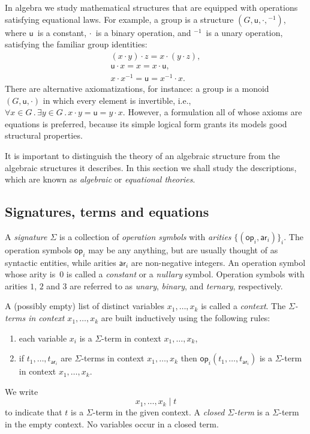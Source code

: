 \documentclass{amsart}
\newcommand{\all}[1]{\forall #1 \,.\,} %
\newcommand{\some}[1]{\exists #1 \,.\,} %
\newcommand{\family}[2]{\{#1\}_{#2}} %
\newcommand{\op}[1]{\mathsf{op}_{#1}} %
\newcommand{\arity}[1]{\mathsf{ar}_{#1}} %
\begin{document}
In algebra we study mathematical structures that are equipped with operations satisfying
equational laws. For example, a group is a structure $(G, \mathsf{u}, {\cdot}, {}^{-1})$,
where $\mathsf{u}$~is a constant, $\cdot$~is a binary operation, and ${}^{-1}$~is a unary
operation, satisfying the familiar group identities:
%
\begin{gather*}
  (x \cdot y) \cdot z = x \cdot (y \cdot z),\\
  \mathsf{u} \cdot x = x = x \cdot \mathsf{u},\\
  x \cdot x^{-1} = \mathsf{u} = x^{-1} \cdot x.
\end{gather*}
%
There are alternative axiomatizations, for instance: a group is a monoid
$(G, \mathsf{u}, {\cdot})$ in which every element is invertible, i.e.,
$\all{x \in G} \some{y \in G} x \cdot y = \mathsf{u} = y \cdot x$. However, a
formulation all of whose axioms are equations is preferred, because its simple
logical form grants its models good structural properties.

It is important to distinguish the theory of an algebraic structure from the
algebraic structures it describes. In this section we shall study the
descriptions, which are known as \emph{algebraic} or \emph{equational theories}.

\subsection{Signatures, terms and equations}
\label{sec:signatures-equations}

A \emph{signature $\Sigma$} is a collection of \emph{operation symbols} with
\emph{arities} $\family{(\op{i}, \arity{i})}{i}$. The operation symbols
$\op{i}$ may be any anything, but are usually thought of as syntactic entities,
while arities $\arity{i}$ are non-negative integers. An operation symbol whose
arity is~$0$ is called a \emph{constant} or a \emph{nullary} symbol. Operation
symbols with arities $1$, $2$ and $3$ are referred to as \emph{unary},
\emph{binary}, and \emph{ternary}, respectively.

A (possibly empty) list of distinct variables $x_1, \ldots, x_k$ is called a
\emph{context}. The \emph{$\Sigma$-terms in context $x_1, \ldots, x_k$} are
built inductively using the following rules:
%
\begin{enumerate}
\item each variable $x_i$ is a $\Sigma$-term in context $x_1, \ldots, x_k$,
\item if $t_1, \ldots, t_{\arity{i}}$ are $\Sigma$-terms in context $x_1, \ldots, x_k$ then
  $\op{i}(t_1, \ldots, t_{\arity{i}})$ is a $\Sigma$-term in context $x_1, \ldots, x_k$.
\end{enumerate}
%
We write
%
\begin{equation*}
  x_1, \ldots, x_k \mid t
\end{equation*}
%
to indicate that $t$ is a $\Sigma$-term in the given context. A \emph{closed
  $\Sigma$-term} is a $\Sigma$-term in the empty context. No variables occur
in a closed term.
\end{document}
